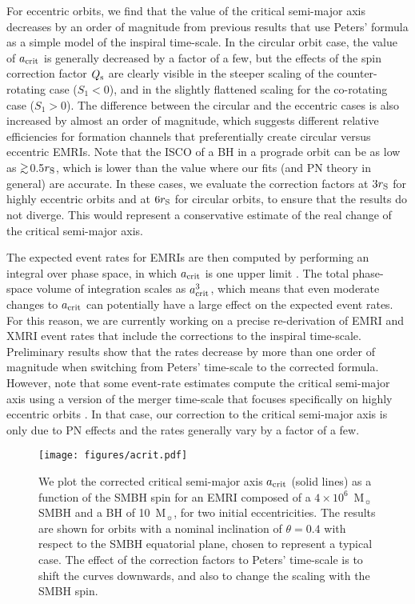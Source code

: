 \documentclass[usenatbib]{mnras}
\def\gsim{\mathrel{\rlap{\lower 3pt \hbox{$\sim$}} \raise 2.0pt \hbox{$>$}}}
\begin{document}
For eccentric orbits, we find that the value of the critical semi-major axis decreases by an order of magnitude from previous results that use Peters' formula as a simple model of the inspiral time-scale. In the circular orbit case, the value of $a_{\rm crit}$ is generally decreased by a factor of a few, but the effects of the spin correction factor $Q_{\rm s}$ are clearly visible in the steeper scaling of the counter-rotating case ($S_1 < 0$), and in the slightly flattened scaling for the co-rotating case ($S_1 > 0$). The difference between the circular and the eccentric cases is also increased by almost an order of magnitude, which suggests different relative efficiencies for formation channels that preferentially create circular versus eccentric EMRIs. Note that the ISCO of a BH in a prograde orbit can be as low as $\gsim$0.5$ r_{\rm S}$, which is lower than the value where our fits (and PN theory in general) are accurate. In these cases, we evaluate the correction factors at $3 r_{\rm S}$ for highly eccentric orbits and at $6 r_{\rm S}$ for circular orbits, to ensure that the results do not diverge. This would represent a conservative estimate of the real change of the critical semi-major axis.

The expected event rates for EMRIs are then computed by performing an integral over phase space, in which $a_{\rm{crit}}$ is one upper limit \citep{pau_2013,Amaro_Seoane_2019}. The total phase-space volume of integration scales as $a_{\rm{crit}}^3$, which means that even moderate changes to $a_{\rm{crit}}$ can potentially have a large effect on the expected event rates. For this reason, we are currently working on a precise re-derivation of EMRI and XMRI \citep{Amaro_Seoane_2019} event rates that include the corrections to the inspiral time-scale. Preliminary results show that the rates decrease by more than one order of magnitude when switching from Peters' time-scale to the corrected formula. However, note that some event-rate estimates compute the critical semi-major axis using a version of the merger time-scale that focuses specifically on highly eccentric orbits \citep{Amaro_Seoane_2019}. In that case, our correction to the critical semi-major axis is only due to PN effects and the rates generally vary by a factor of a few.

\begin{figure}
    \texttt{[image: figures/acrit.pdf]}
    \caption{We plot the corrected critical semi-major axis $a_{\rm{crit}}$ (solid lines) as a function of the SMBH spin for an EMRI composed of a $4 \times 10^6$~M$_{\sun}$ SMBH and a BH of 10~M$_{\sun}$, for two initial eccentricities. The results are shown for orbits with a nominal inclination of $\theta=0.4$ with respect to the SMBH equatorial plane, chosen to represent a typical case. The effect of the correction factors to Peters' time-scale is to shift the curves downwards, and also to change the scaling with the SMBH spin.} 
    \label{fig:acritVSspinHIGHecc}
\end{figure}
\end{document}
